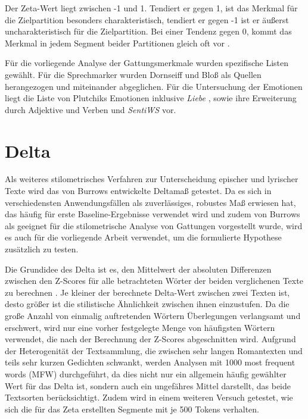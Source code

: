 \documentclass[a4paper,10p]{article}
\begin{document}
 
Der Zeta-Wert liegt zwischen -1 und 1. Tendiert er gegen 1, ist das Merkmal für die Zielpartition besonders charakteristisch, tendiert er gegen -1 ist er äußerst uncharakteristisch für die Zielpartition. Bei einer Tendenz gegen 0, kommt das Merkmal in jedem Segment beider Partitionen gleich oft vor \citep[vgl.][S. 79 f.]{SchoechZeta}.

Für die vorliegende Analyse der Gattungsmerkmale wurden spezifische Listen gewählt. Für die Sprechmarker wurden Dornseiff \citep{Dornseiff2000} und Bloß \cite{Bloss2005} als Quellen herangezogen und miteinander abgeglichen. Für die Untersuchung der Emotionen liegt die Liste von Plutchiks Emotionen inklusive \textit{Liebe} \citep{Plutchik}, sowie ihre Erweiterung durch Adjektive und Verben und \textit{SentiWS} \citep{Sentiws} vor.

\section{Delta}
Als weiteres stilometrisches Verfahren zur Unterscheidung epischer und lyrischer Texte wird das von Burrows entwickelte Deltamaß getestet. Da es sich in verschiedensten Anwendungsfällen als zuverlässiges, robustes Maß erwiesen hat, das häufig für erste Baseline-Ergebnisse verwendet wird und zudem von Burrows als geeignet für die stilometrische Analyse von Gattungen vorgestellt wurde, wird es auch für die vorliegende Arbeit verwendet, um die formulierte Hypothese zusätzlich zu testen.\par 

Die Grundidee des Delta ist es, den Mittelwert der absoluten Differenzen zwischen den Z-Scores für alle betrachteten Wörter der beiden verglichenen Texte zu berechnen \citep[vgl.][S. 17]{Stamatatos}. Je kleiner der berechnete Delta-Wert zwischen zwei Texten ist, desto größer ist die stilistische Ähnlichkeit zwischen ihnen einzustufen. Da die große Anzahl von einmalig auftretenden Wörtern Überlegungen verlangsamt und erschwert, wird nur eine vorher festgelegte Menge von häufigsten Wörtern verwendet, die nach der Berechnung der Z-Scores abgeschnitten wird. Aufgrund der Heterogenität der Textsammlung, die zwischen sehr langen Romantexten und teils sehr kurzen Gedichten schwankt, werden Analysen mit 1000 most frequent words (MFW) durchgeführt, da dies nicht nur ein allgemein häufig gewählter Wert für das Delta ist, sondern auch ein ungefähres Mittel darstellt, das beide Textsorten berücksichtigt. Zudem wird in einem weiteren Versuch getestet, wie sich die für das Zeta erstellten Segmente mit je 500 Tokens verhalten. \par 
\end{document}
